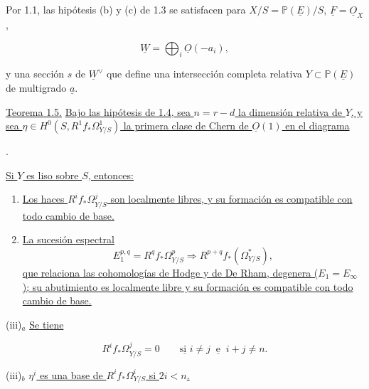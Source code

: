 Por 1.1, las hipótesis (b) y (c) de 1.3 se satisfacen para
$X/S=\mathbb P(\underline E)/S$, $\underline F=\underline O_X$,

\begin{equation*}
\underline W=\bigoplus_i\underline O(-a_i),
\end{equation*}

y una sección $s$ de $\underline W^\vee$ que define una intersección
completa relativa $Y\subset\mathbb P(\underline E)$ de multigrado
$\underline a$.

\medskip
\noindent\underline{Teorema 1.5.}\quad
\underline{Bajo las hipótesis de 1.4, sea $n=r-d$ la dimensión relativa de
$Y$, y sea $\eta\in H^0(S,R^1f_*\Omega^1_{Y/S})$ la primera clase de Chern
de $\underline O(1)$ en el diagrama}

\begin{center}
\qquad .
\end{center}

\underline{Si $Y$ es liso sobre $S$, entonces:}

\begin{enumerate}[label=(\roman*),leftmargin=2.6em]
\item \underline{Los haces $R^if_*\Omega^j_{Y/S}$ son localmente libres,
y su formación es compatible con todo cambio de base.}

\item \underline{La sucesión espectral}
\begin{equation*}
E_1^{p,q}=R^qf_*\Omega^p_{Y/S}\Longrightarrow
R^{p+q}f_*(\Omega^*_{Y/S}),
\end{equation*}
\underline{que relaciona las cohomologías de Hodge y de De Rham, degenera
($E_1=E_\infty$); su abutimiento es localmente libre y su formación es
compatible con todo cambio de base.}
\end{enumerate}

\noindent(iii)$_a$ \underline{Se tiene}

\begin{equation*}
R^if_*\Omega^j_{Y/S}=0
\qquad\underline{\text{si }}i\ne j\ \underline{\text{ e }}\ i+j\ne n.
\end{equation*}

\pageoriginale

\noindent(iii)$_b$ \underline{$\eta^i$ es una base de
$R^if_*\Omega^i_{Y/S}$ si $2i<n$.}

